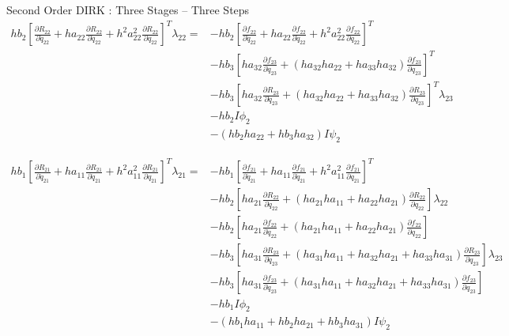 \documentclass{beamer}
\newcommand{\pd}[2]{\frac{\partial #1}{\partial #2}}
\begin{document}
\begin{frame}[allowframebreaks]{Second Order DIRK : Three Stages -- Three Steps}
\begin{equation}
  \begin{split}
    hb_2\left[\pd{R_{22}}{\ddot{q}_{22}} + ha_{22}\pd{R_{22}}{\dot{q}_{22}} + h^2a_{22}^2 \pd{R_{22}}{{q}_{22}} \right]^T \lambda_{22} = & - hb_2 \left[\pd{f_{22}}{\ddot{q}_{22}} + ha_{22}\pd{f_{22}}{\dot{q}_{22}} + h^2a_{22}^2 \pd{f_{22}}{{q}_{22}} \right]^T \\ 
    & - hb_3 \left[ha_{32}\pd{f_{23}}{\dot{q}_{23}} + (ha_{32}ha_{22} + ha_{33}ha_{32}) \pd{f_{23}}{{q}_{23}} \right]^T \\  
    & - hb_3 \left[ha_{32}\pd{R_{23}}{\dot{q}_{23}} + (ha_{32}ha_{22} + ha_{33}ha_{32}) \pd{R_{23}}{{q}_{23}} \right]^T\lambda_{23} \\  
    & - hb_2 I \phi_2 \\ 
    & - (hb_2ha_{22} + hb_3 ha_{32}) I  \psi_2
  \end{split}
\end{equation}

\begin{equation}
  \begin{split}
    hb_1\left[\pd{R_{21}}{\ddot{q}_{21}} + ha_{11}\pd{R_{21}}{\dot{q}_{21}} + h^2a_{11}^2 \pd{R_{21}}{{q}_{21}} \right]^T \lambda_{21} = & - hb_1 \left[\pd{f_{21}}{\ddot{q}_{21}} + ha_{11}\pd{f_{21}}{\dot{q}_{21}} + h^2a_{11}^2 \pd{f_{21}}{{q}_{21}} \right]^T \\ 
    & - hb_2 \left[ ha_{21} \pd{R_{22}}{\dot{q}_{22}} + (ha_{21}ha_{11} + ha_{22}ha_{21}) \pd{R_{22}}{{q}_{22}} \right]\lambda_{22} \\
    & - hb_2 \left[ ha_{21} \pd{f_{22}}{\dot{q}_{22}} + (ha_{21}ha_{11} + ha_{22}ha_{21}) \pd{f_{22}}{{q}_{22}} \right] \\
    & - hb_3 \left[ ha_{31} \pd{R_{23}}{\dot{q}_{23}} + (ha_{31}ha_{11} + ha_{32}ha_{21} + ha_{33}ha_{31}) \pd{R_{23}}{{q}_{23}} \right] \lambda_{23} \\
    & - hb_3 \left[ ha_{31} \pd{f_{23}}{\dot{q}_{23}} + (ha_{31}ha_{11} + ha_{32}ha_{21} + ha_{33}ha_{31}) \pd{f_{23}}{{q}_{23}} \right] \\
    & - hb_1I \phi_2 \\ 
    & - (hb_1ha_{11} + hb_2ha_{21}+ hb_3ha_{31}) I \psi_2
  \end{split}
\end{equation}

\end{frame}
\end{document}
